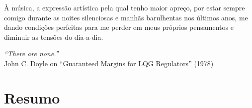 \documentclass[a4paper,11pt]{book}
\numberwithin{figure}{chapter}
\numberwithin{equation}{chapter}
\numberwithin{table}{chapter}
\theoremstyle{definition}
\begin{document}
\noindent À música, a expressão artística pela qual tenho maior apreço, por estar sempre comigo durante as noites silenciosas e manhãs barulhentas nos últimos anos, me dando condições perfeitas para me perder em meus próprios pensamentos e diminuir as tensões do dia-a-dia.

\clearpage
\thispagestyle{empty}%
\newpage
\null\vfill
\begin{flushright}

{\large \textit{``There are none.''}}\\ {\small John C. Doyle on ``Guaranteed Margins for LQG Regulators'' (1978)}

\end{flushright}

\clearpage
\thispagestyle{empty}%

\chapter*{Resumo}
\thispagestyle{empty}
\end{document}
